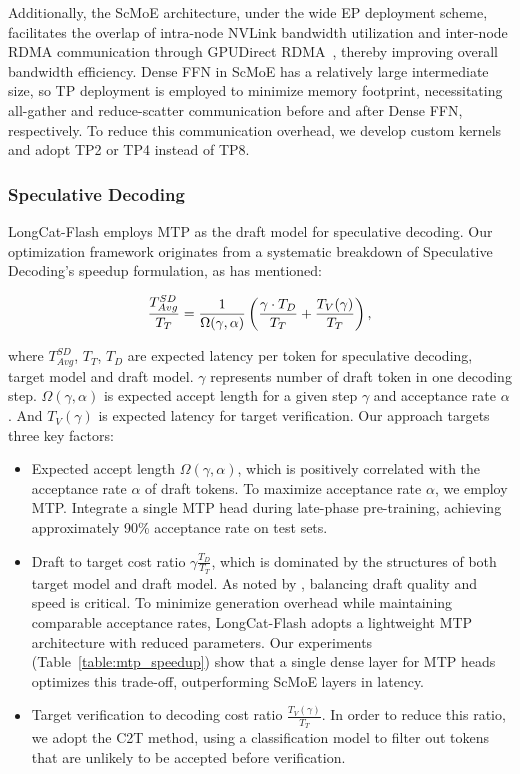 \documentclass{article}
\newcommand{\longcat}{LongCat-Flash\xspace}
\begin{document}
Additionally, the ScMoE architecture, under the wide EP deployment scheme, facilitates the overlap of intra-node NVLink bandwidth utilization and inter-node RDMA communication through GPUDirect RDMA~\citep{choquette2022nvidia}, thereby improving overall bandwidth efficiency. Dense FFN in ScMoE has a relatively large intermediate size, so TP deployment is employed to minimize memory footprint, necessitating all-gather and reduce-scatter communication before and after Dense FFN, respectively. To reduce this communication overhead, we develop custom kernels and adopt TP2 or TP4 instead of TP8. 

\subsubsection{Speculative Decoding}

\longcat employs MTP as the draft model for speculative decoding. Our optimization framework originates from a systematic breakdown of Speculative Decoding's speedup formulation, as \citet{sadhukhan2025magicdecbreakinglatencythroughputtradeoff} has mentioned:

\begin{equation}
\frac{T^{SD}_{Avg}}{T_T} = \frac{1}{\Omega(\gamma, \alpha)} \left(\frac{\gamma \cdot T_D}{T_T} + \frac{T_V(\gamma)}{T_T}\right), \notag
\label{eq:spec_formula}
\end{equation}

where $T^{SD}_{Avg}$, $T_T$, $T_D$ are expected latency per token for speculative decoding, target model and draft model. $\gamma$ represents number of draft token in one decoding step. $\Omega(\gamma, \alpha)$ is expected accept length for a given step $\gamma$ and acceptance rate $\alpha$. And $T_V(\gamma)$ is expected latency for target verification. Our approach targets three key factors:

\begin{itemize}
\item Expected accept length $\Omega(\gamma, \alpha)$, which is positively correlated with the acceptance rate $\alpha$ of draft tokens. To maximize acceptance rate $\alpha$, we employ MTP. Integrate a single MTP head during late-phase pre-training, achieving approximately 90\% acceptance rate on test sets.
\item  Draft to target cost ratio $\gamma\frac{T_D}{T_T}$, which is dominated by the structures of both target model and draft model. As noted by \citet{liu2024speculativedecodingearlyexitingfaster}, balancing draft quality and speed is critical. To minimize generation overhead while maintaining comparable acceptance rates, \longcat adopts a lightweight MTP architecture with reduced parameters. Our experiments (Table~\ref{table:mtp_speedup}) show that a single dense layer for MTP heads optimizes this trade-off, outperforming ScMoE layers in latency.
\item Target verification to decoding cost ratio $\frac{T_V(\gamma)}{T_T}$. In order to reduce this ratio, we adopt the C2T \citep{huo2025c2tclassifierbasedtreeconstruction} method, using a classification model to filter out tokens that are unlikely to be accepted before verification.
\end{itemize}
\end{document}

